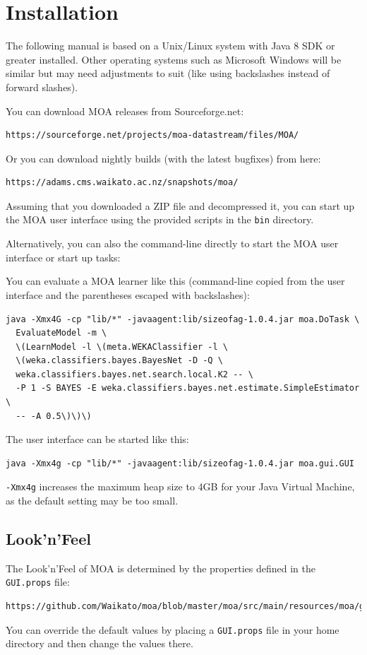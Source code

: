 \documentclass[a4paper,12pt,twoside]{book}
\begin{document}
\chapter{Installation}

The following manual is based on a Unix/Linux system with Java 8 SDK or greater installed.
Other operating systems such as Microsoft Windows will be similar but may need adjustments
to suit (like using backslashes instead of forward slashes).

\noindent You can download MOA releases from Sourceforge.net:
\begin{verbatim}
https://sourceforge.net/projects/moa-datastream/files/MOA/
\end{verbatim}

\noindent Or you can download nightly builds (with the latest bugfixes) from here:
\begin{verbatim}
https://adams.cms.waikato.ac.nz/snapshots/moa/
\end{verbatim}

Assuming that you downloaded a ZIP file and decompressed it, you can start up
the MOA user interface using the provided scripts in the \verb|bin| directory.

Alternatively, you can also the command-line directly to start the MOA user
interface or start up tasks:

You can evaluate a MOA learner like this (command-line copied from the user
interface and the parentheses escaped with backslashes):
{\scriptsize
\begin{verbatim}
java -Xmx4G -cp "lib/*" -javaagent:lib/sizeofag-1.0.4.jar moa.DoTask \
  EvaluateModel -m \
  \(LearnModel -l \(meta.WEKAClassifier -l \
  \(weka.classifiers.bayes.BayesNet -D -Q \
  weka.classifiers.bayes.net.search.local.K2 -- \
  -P 1 -S BAYES -E weka.classifiers.bayes.net.estimate.SimpleEstimator \
  -- -A 0.5\)\)\)
\end{verbatim}}
\noindent The user interface can be started like this:
{\scriptsize
\begin{verbatim}
java -Xmx4g -cp "lib/*" -javaagent:lib/sizeofag-1.0.4.jar moa.gui.GUI
\end{verbatim}}

\texttt{-Xmx4g} increases the maximum heap size to 4GB for your Java Virtual Machine, as
the default setting may be too small.

\section{Look'n'Feel}
The Look'n'Feel of MOA is determined by the properties defined in the \verb|GUI.props|
file:
{\scriptsize
\begin{verbatim}
https://github.com/Waikato/moa/blob/master/moa/src/main/resources/moa/gui/GUI.props
\end{verbatim}}
You can override the default values by placing a \verb|GUI.props| file in your
home directory and then change the values there.
\end{document}
